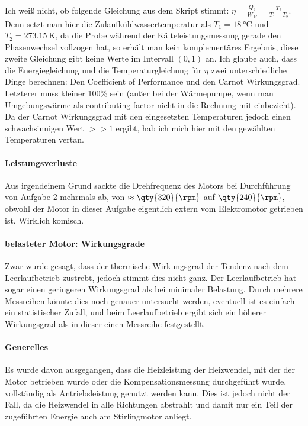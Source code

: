 Ich weiß nicht, ob folgende Gleichung aus dem Skript stimmt: \(\eta=\frac{Q_2}{W_M}=\frac{T_2}{T_1-T_2}\). Denn setzt man hier die Zulaufkühlwassertemperatur als \(T_1=\qty{18}{\degreeCelsius}\) und \(T_2=\qty{273.15}{\kelvin}\), da die Probe während der Kälteleistungsmessung gerade den Phasenwechsel vollzogen hat, so erhält man kein komplementäres Ergebnis, diese zweite Gleichung gibt  keine Werte im Intervall \((0,1)\) an. Ich glaube auch, dass die Energiegleichung und die Temperaturgleichung für \(\eta\) zwei unterschiedliche Dinge berechnen: Den Coefficient of Performance und den Carnot Wirkungsgrad. Letzterer muss kleiner 100\% sein (außer bei der Wärmepumpe, wenn man Umgebungswärme als contributing factor nicht in die Rechnung mit einbezieht). Da der Carnot Wirkungsgrad mit den eingesetzten Temperaturen jedoch einen schwachsinnigen Wert \(>>1\) ergibt, hab ich mich hier mit den gewählten Temperaturen vertan. 

\paragraph{Leistungsverluste}
Aus irgendeinem Grund sackte die Drehfrequenz des Motors bei Durchführung von Aufgabe 2 mehrmals ab, von \(\approx\qty{320}{\rpm}\) auf \(\qty{240}{\rpm}\), obwohl der Motor in dieser Aufgabe eigentlich extern vom Elektromotor getrieben ist. Wirklich komisch. 

\paragraph{belasteter Motor: Wirkungsgrade}
Zwar wurde gesagt, dass der thermische Wirkungsgrad der Tendenz nach dem Leerlaufbetrieb zustrebt, jedoch stimmt dies nicht ganz. Der Leerlaufbetrieb hat sogar einen geringeren Wirkungsgrad als bei minimaler Belastung. Durch mehrere Messreihen könnte dies noch genauer untersucht werden, eventuell ist es einfach ein statistischer Zufall, und beim Leerlaufbetrieb ergibt sich ein höherer Wirkungsgrad als in dieser einen Messreihe festgestellt.

\paragraph{Generelles}
Es wurde davon ausgegangen, dass die Heizleistung der Heizwendel, mit der der Motor betrieben wurde oder die Kompensationsmessung durchgeführt wurde, vollständig als Antriebsleistung genutzt werden kann. Dies ist jedoch nicht der Fall, da die Heizwendel in alle Richtungen abstrahlt und damit nur ein Teil der zugeführten Energie auch am Stirlingmotor anliegt.  

